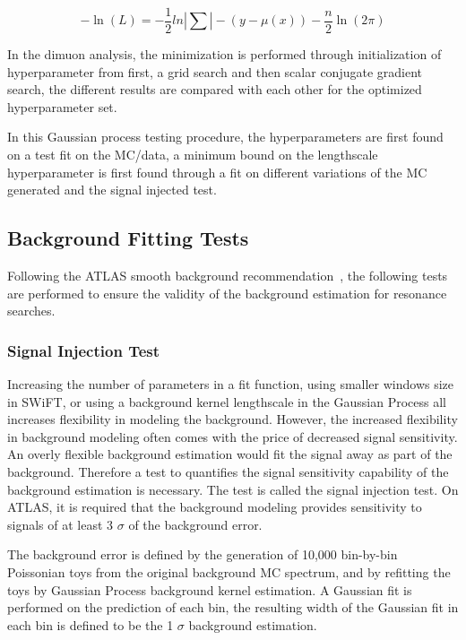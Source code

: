     \begin{equation}
        -\ln(L) = -\frac{1}{2} ln |\sum| - (y-\mu(x) ) - \frac{n}{2}\ln(2\pi)
    \label{eq:loglikelihood}
    \end{equation}
    
    In the dimuon analysis, the minimization is performed through initialization of hyperparameter from first, a grid search and then scalar conjugate gradient search, the different results are compared with each other for the optimized hyperparameter set.

    In this Gaussian process testing procedure, the hyperparameters are first found on a test fit on the MC/data, a minimum bound on the lengthscale hyperparameter is first found through a fit on different variations of the MC generated and the signal injected test.
%
\subsection{Background Fitting Tests}
Following the ATLAS smooth background recommendation~\cite{ATL-PHYS-PUB-2020-028}, the following tests are performed to ensure the validity of the background estimation for resonance searches.

\subsubsection{Signal Injection Test}
\label{sec:signalInjection}

    Increasing the number of parameters in a fit function, using smaller windows size in SWiFT, or using a background kernel lengthscale in the Gaussian Process all increases flexibility in modeling the background. However, the increased flexibility in background modeling often comes with the price of decreased signal sensitivity. An overly flexible background estimation would fit the signal away as part of the background. 
    Therefore a test to quantifies the signal sensitivity capability of the background estimation is necessary. The test is called the signal injection test. On ATLAS, it is required that the background modeling provides sensitivity to signals of at least 3 $\sigma$ of the background error.

    The background error is defined by the generation of 10,000 bin-by-bin Poissonian toys from the original background MC spectrum, and by refitting the toys by Gaussian Process background kernel estimation. A Gaussian fit is performed on the prediction of each bin, the resulting width of the Gaussian fit in each bin is defined to be the 1 $\sigma$ background estimation. 

